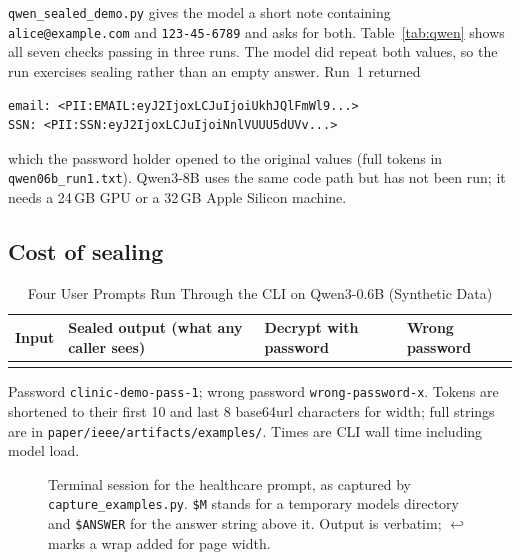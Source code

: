 \documentclass[conference,compsoc]{IEEEtran}
\newcommand{\code}[1]{\texttt{#1}}
\begin{document}
\code{qwen\_sealed\_demo.py} gives the model a short note containing \code{alice@example.com} and \code{123-45-6789} and asks for both. Table~\ref{tab:qwen} shows all seven checks passing in three runs. The model did repeat both values, so the run exercises sealing rather than an empty answer. Run~1 returned
\begin{lstlisting}[frame=none,aboveskip=2pt]
email: <PII:EMAIL:eyJ2IjoxLCJuIjoiUkhJQlFmWl9...>
SSN: <PII:SSN:eyJ2IjoxLCJuIjoiNnlVUUU5dUVv...>
\end{lstlisting}
which the password holder opened to the original values (full tokens in \code{qwen06b\_run1.txt}). Qwen3-8B uses the same code path but has not been run; it needs a 24\,GB GPU or a 32\,GB Apple Silicon machine.

\subsection{Cost of sealing}

\begin{table}[!t]
\caption{Four User Prompts Run Through the CLI on Qwen3-0.6B (Synthetic Data)}
\label{tab:userio}
\centering
\footnotesize
\renewcommand{\arraystretch}{1.15}
\begin{tabularx}{\textwidth}{@{}P{0.22\textwidth}P{0.29\textwidth}LP{0.10\textwidth}@{}}
\toprule
Input & Sealed output (what any caller sees) & Decrypt with password & Wrong password \\
\midrule
{}
\bottomrule
\end{tabularx}
\par\smallskip\parbox{\textwidth}{\scriptsize Password \code{clinic-demo-pass-1}; wrong password \code{wrong-password-x}. Tokens are shortened to their first 10 and last 8 base64url characters for width; full strings are in \code{paper/ieee/artifacts/examples/}. Times are CLI wall time including model load.}
\end{table}

\begin{figure}[!t]

\caption{Terminal session for the healthcare prompt, as captured by \code{capture\_examples.py}. \code{\$M} stands for a temporary models directory and \code{\$ANSWER} for the answer string above it. Output is verbatim; $\hookleftarrow$ marks a wrap added for page width.}
\label{fig:cli}
\end{figure}
\end{document}
